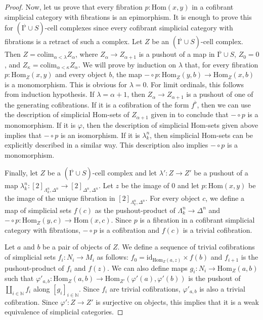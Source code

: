 \documentclass[reqno]{amsart}
\theoremstyle{definition}
\theoremstyle{remark}
\newcommand{\fs}[1]{\mathrm{#1}}
\newcommand{\Hom}{\fs{Hom}}
\newcommand{\id}{\fs{id}}
\newcommand{\colim}{\fs{colim}}
\newcommand{\I}{\fs{I}}
\newcommand{\class}[2]{#1\text{-}\mathrm{#2}}
\newcommand{\Icell}[1][\I]{\class{#1}{cell}}
\numberwithin{figure}{section}
\begin{document}
\begin{proof}
Now, let us prove that every fibration $p : \Hom(x,y)$ in a cofibrant simplicial category with fibrations is an epimorphism.
It is enough to prove this for $\Icell[(\I^\flat \cup S)]$ complexes since every cofibrant simplicial category with fibrations is a retract of such a complex.
Let $Z$ be an $\Icell[(\I^\flat \cup S)]$ complex.
Then $Z = \colim_{\alpha < \lambda} Z_\alpha$, where $Z_\alpha \to Z_{\alpha + 1}$ is a pushout of a map in $\I^\flat \cup S$, $Z_0 = 0$, and $Z_\kappa = \colim_{\alpha < \kappa} Z_\alpha$.
We will prove by induction on $\lambda$ that, for every fibration $p : \Hom_Z(x,y)$ and every object $b$, the map $- \circ p : \Hom_Z(y,b) \to \Hom_Z(x,b)$ is a monomorphism.
This is obvious for $\lambda = 0$.
For limit ordinals, this follows from induction hypothesis.
If $\lambda = \alpha+1$, then $Z_\alpha \to Z_{\alpha+1}$ is a pushout of one of the generating cofibrations.
If it is a cofibration of the form $f^\flat$, then we can use the description of simplicial $\Hom$-sets of $Z_{\alpha+1}$ given in \cite[Proposition~A.3.2.4]{lurie-topos} to conclude that $- \circ p$ is a monomorphism.
If it is $\varphi$, then the description of simplicial $\Hom$-sets given above implies that $- \circ p$ is an isomorphism.
If it is $\lambda^n_k$, then simplicial $\Hom$-sets can be explicitly described in a similar way.
This description also implies $- \circ p$ is a monomorphism.

Finally, let $Z$ be a $\Icell[(\I^\flat \cup S)]$ complex and let $\lambda' : Z \to Z'$ be a pushout of a map $\lambda^n_k : [2]_{\Lambda^n_k,\Delta^n} \to [2]_{\Delta^n,\Delta^n}$.
Let $z$ be the image of $0$ and let $p : \Hom(x,y)$ be the image of the unique fibration in $[2]_{\Lambda^n_k,\Delta^n}$.
For every object $c$, we define a map of simplicial sets $f(c)$ as the pushout-product of $\Lambda^n_k \to \Delta^n$ and $- \circ p : \Hom_Z(y,c) \to \Hom(x,c)$.
Since $p$ is a fibration in a cofibrant simplicial category with fibrations, $- \circ p$ is a cofibration and $f(c)$ is a trivial cofibration.

Let $a$ and $b$ be a pair of objects of $Z$.
We define a sequence of trivial cofibrations of simplicial sets $f_i : N_i \to M_i$ as follows:
$f_0 = \id_{\Hom_Z(a,z)} \times f(b)$ and $f_{i+1}$ is the pushout-product of $f_i$ and $f(z)$.
We can also define maps $g_i : N_i \to \Hom_Z(a,b)$ such that $\varphi'_{a,b} : \Hom_Z(a,b) \to \Hom_{Z'}(\varphi'(a),\varphi'(b))$ is the pushout of $\coprod_{i \in \mathbb{N}} f_i$ along $[g_i]_{i \in \mathbb{N}}$.
Since $f_i$ are trivial cofibrations, $\varphi'_{a,b}$ is also a trivial cofibration.
Since $\varphi' : Z \to Z'$ is surjective on objects, this implies that it is a weak equivalence of simplicial categories.
\end{proof}
\end{document}
